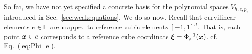 So far, we have not yet specified a concrete basis for the polynomial spaces $V_{h,e,p_e}$ introduced in Sec.~\ref{sec:weakequations}. We do so now.
Recall that curvilinear elements $e \in \mathbb{E}$ are mapped to reference
cubic elements $[-1,1]^d$.
That is, each point $\boldsymbol{x}\in e$ corresponds to a reference cube coordinate $\boldsymbol{\xi} =\Phi_e^{-1}(\boldsymbol{x})$, cf. Eq.~(\ref{eq:Phi_e}).


